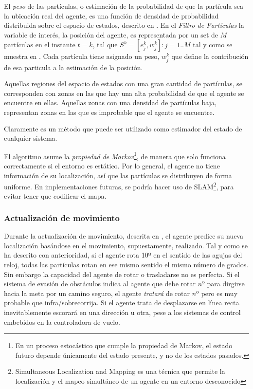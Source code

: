 El \textit{peso} de las partículas, o estimación de la probabilidad de que la partícula sea la ubicación real del agente, es una función de densidad de probabilidad distribuida sobre el espacio de estados, descrito en \citep{wiki:RLtPF}. 
En el \emph{Filtro de Partículas} la variable de interés, la posición del agente, es representada por un set de $M$ partículas en el instante $t = k$, tal que $S^k=[e_j^k,w_j^k]:j=1..M$ tal y como se muestra en \citep{art:PFTuto}. Cada partícula tiene asignado un peso, $w_j^k$ que define la contribución de esa particula a la estimación de la posición.

Aquellas regiones del espacio de estados con una gran cantidad de partículas, se corresponden con zonas en las que hay una alta probabilidad de que el agente se encuentre en ellas. Aquellas zonas con una densidad de partículas baja, representan zonas en las que es improbable que el agente se encuentre.

Claramente es un método que puede ser utilizado como estimador del estado de cualquier sistema.

El algoritmo asume la \textit{propiedad de Markov}\footnote{En un proceso estocástico que cumple la propiedad de Markov, el estado futuro depende únicamente del estado presente, y no de los estados pasados.}, de manera que solo funciona correctamente si el entorno es estático. Por lo general, el agente no tiene información de su localización, así que las partículas se distribuyen de forma uniforme. En implementaciones futuras, se podría hacer uso de SLAM\footnote{Simultaneous Localization and Mapping es una técnica que permite la localización y el mapeo simultáneo de un agente en un entorno desconocido}, para evitar tener que codificar el mapa.

\subsubsection{Actualización de movimiento}
Durante la actualización de movimiento, descrita en \citep{art:PFTuto, art:PFBL}, el agente predice su nueva localización basándose en el movimiento, supuestamente, realizado. Tal y como se ha descrito con anterioridad, si el agente rota 10º en el sentido de las agujas del reloj, todas las partículas rotan en ese mismo sentido el mismo número de grados. 
Sin embargo la capacidad del agente de rotar o trasladarse no es perfecta. Si el sistema de evasión de obstáculos indica al agente que debe rotar $nº$ para dirgirse hacia la meta por un camino seguro, el agente \emph{tratará} de rotar $nº$ pero es muy probable que infra/sobrecorrija.
Si el agente trata de desplazarse en línea recta inevitablemente escorará en una dirección u otra, pese a los sistemas de control embebidos en la controladora de vuelo. 

